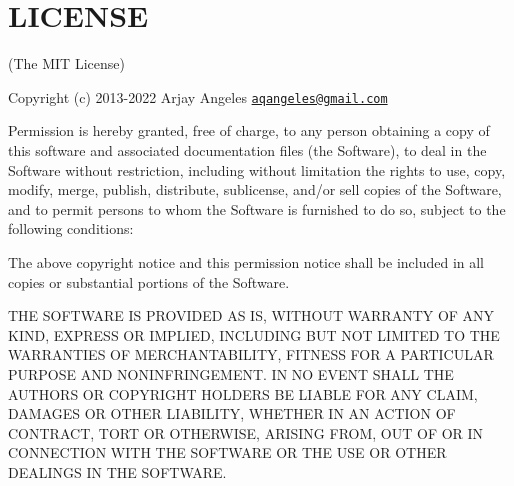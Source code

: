 \chapter{LICENSE }
\hypertarget{md__c_1_2xampp_2htdocs_2_g_pagos_ayuntamiento_2vendor_2yajra_2laravel-datatables-oracle_2_l_i_c_e_n_s_e}{}\label{md__c_1_2xampp_2htdocs_2_g_pagos_ayuntamiento_2vendor_2yajra_2laravel-datatables-oracle_2_l_i_c_e_n_s_e}
(The MIT License)

Copyright (c) 2013-\/2022 Arjay Angeles \href{mailto:aqangeles@gmail.com}{\texttt{aqangeles@gmail.\+com}}

Permission is hereby granted, free of charge, to any person obtaining a copy of this software and associated documentation files (the \textquotesingle{}Software\textquotesingle{}), to deal in the Software without restriction, including without limitation the rights to use, copy, modify, merge, publish, distribute, sublicense, and/or sell copies of the Software, and to permit persons to whom the Software is furnished to do so, subject to the following conditions\+:

The above copyright notice and this permission notice shall be included in all copies or substantial portions of the Software.

THE SOFTWARE IS PROVIDED \textquotesingle{}AS IS\textquotesingle{}, WITHOUT WARRANTY OF ANY KIND, EXPRESS OR IMPLIED, INCLUDING BUT NOT LIMITED TO THE WARRANTIES OF MERCHANTABILITY, FITNESS FOR A PARTICULAR PURPOSE AND NONINFRINGEMENT. IN NO EVENT SHALL THE AUTHORS OR COPYRIGHT HOLDERS BE LIABLE FOR ANY CLAIM, DAMAGES OR OTHER LIABILITY, WHETHER IN AN ACTION OF CONTRACT, TORT OR OTHERWISE, ARISING FROM, OUT OF OR IN CONNECTION WITH THE SOFTWARE OR THE USE OR OTHER DEALINGS IN THE SOFTWARE. 
